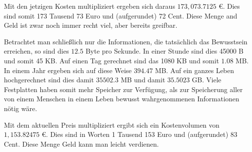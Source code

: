 \documentclass[a4paper,10pt]{scrartcl}
\begin{document}
Mit den jetzigen Kosten multipliziert ergeben sich daraus $173,073.7125$ \euro{}. Dies sind somit 173 Tausend 73 Euro und (aufgerundet) 72 Cent. Diese Menge and Geld ist zwar noch immer recht viel, aber bereits greifbar.


Betrachtet man schließlich nur die Informationen, die tatsächlich das Bewusstsein erreichen, so sind dies $12.5$ Byte pro Sekunde. In einer Stunde sind dies 45000 B und somit 45 KB. Auf einen Tag gerechnet sind das 1080 KB und somit $1.08$ MB. In einem Jahr ergeben sich auf diese Weise $394.47$ MB. Auf ein ganzes Leben hochgerechnet sind dies damit $35502.3$ MB und damit $35.5023$ GB. Viele Festplatten haben somit mehr Speicher zur Verfügung, als zur Speicherung aller von einem Menschen in einem Leben bewusst wahrgenommenen Informationen nötig wäre.

Mit dem aktuellen Preis multipliziert ergibt sich ein Kostenvolumen von $1,153.82475$ \euro{}. Dies sind in Worten 1 Tausend 153 Euro und (aufgerundet) 83 Cent. Diese Menge Geld kann man leicht verdienen. 
\end{document}
